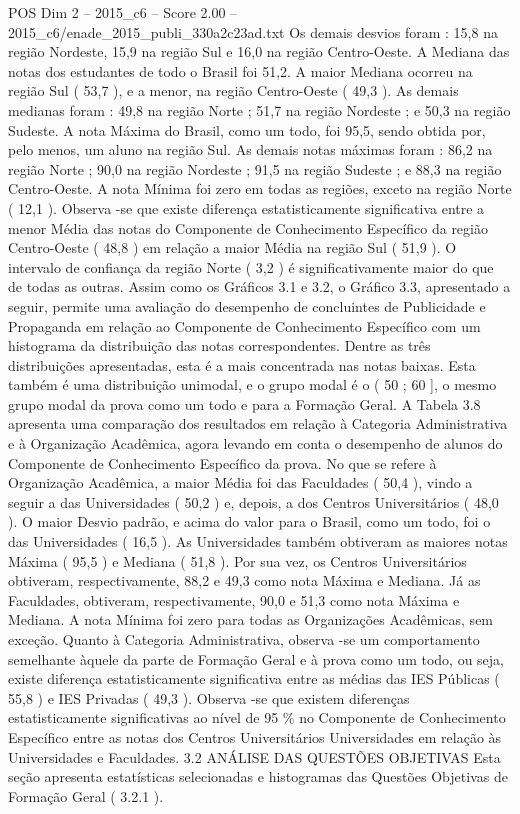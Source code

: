\begin{textsample}{POS Dim 2 – 2015\_c6 – Score 2.00 – 2015\_c6/enade\_2015\_publi\_330a2c23ad.txt}
Os demais desvios foram : 15,8 na região Nordeste, 15,9 na região Sul e 16,0 na região Centro-Oeste.
A Mediana das notas dos estudantes de todo o Brasil foi 51,2.
A maior Mediana ocorreu na região Sul ( 53,7 ), e a menor, na região Centro-Oeste ( 49,3 ).
As demais medianas foram : 49,8 na região Norte ; 51,7 na região Nordeste ; e 50,3 na região Sudeste.
A nota Máxima do Brasil, como um todo, foi 95,5, sendo obtida por, pelo menos, um aluno na região Sul.
As demais notas máximas foram : 86,2 na região Norte ; 90,0 na região Nordeste ; 91,5 na região Sudeste ; e 88,3 na região Centro-Oeste.
A nota Mínima foi zero em todas as regiões, exceto na região Norte ( 12,1 ).
Observa -se que existe diferença estatisticamente significativa entre a menor Média das notas do Componente de Conhecimento Específico da região Centro-Oeste ( 48,8 ) em relação a maior Média na região Sul ( 51,9 ).
O intervalo de confiança da região Norte ( 3,2 ) é significativamente maior do que de todas as outras.
Assim como os Gráficos 3.1 e 3.2, o Gráfico 3.3, apresentado a seguir, permite uma avaliação do desempenho de concluintes de Publicidade e Propaganda em relação ao Componente de Conhecimento Específico com um histograma da distribuição das notas correspondentes.
Dentre as três distribuições apresentadas, esta é a mais concentrada nas notas baixas.
Esta também é uma distribuição unimodal, e o grupo modal é o ( 50 ; 60 ], o mesmo grupo modal da prova como um todo e para a Formação Geral.
A Tabela 3.8 apresenta uma comparação dos resultados em relação à Categoria Administrativa e à Organização Acadêmica, agora levando em conta o desempenho de alunos do Componente de Conhecimento Específico da prova.
No que se refere à Organização Acadêmica, a maior Média foi das Faculdades ( 50,4 ), vindo a seguir a das Universidades ( 50,2 ) e, depois, a dos Centros Universitários ( 48,0 ).
O maior Desvio padrão, e acima do valor para o Brasil, como um todo, foi o das Universidades ( 16,5 ).
As Universidades também obtiveram as maiores notas Máxima ( 95,5 ) e Mediana ( 51,8 ).
Por sua vez, os Centros Universitários obtiveram, respectivamente, 88,2 e 49,3 como nota Máxima e Mediana.
Já as Faculdades, obtiveram, respectivamente, 90,0 e 51,3 como nota Máxima e Mediana.
A nota Mínima foi zero para todas as Organizações Acadêmicas, sem exceção.
Quanto à Categoria Administrativa, observa -se um comportamento semelhante àquele da parte de Formação Geral e à prova como um todo, ou seja, existe diferença estatisticamente significativa entre as médias das IES Públicas ( 55,8 ) e IES Privadas ( 49,3 ).
Observa -se que existem diferenças estatisticamente significativas ao nível de 95 \% no Componente de Conhecimento Específico entre as notas dos Centros Universitários Universidades em relação às Universidades e Faculdades. 3.2 ANÁLISE DAS QUESTÕES OBJETIVAS Esta seção apresenta estatísticas selecionadas e histogramas das Questões Objetivas de Formação Geral ( 3.2.1 ).

\end{textsample}
